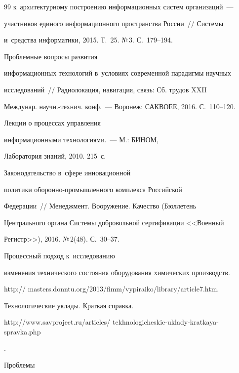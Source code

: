 {{\begin{thebibliography}{99}
к~архитектурному построению информационных систем организаций~--- 


участников единого информационного пространства России~/\!\!/ Системы 


и~средства информатики, 2015. Т.~25. №\,3. С.~179--194.







      Проблемные вопросы развития 


информационных технологий в~условиях современной парадигмы научных 


исследований~/\!\!/ Радиолокация, навигация, связь: Сб. трудов XXII 


Междунар. научн.-технич. конф.~--- Воронеж: САКВОЕЕ, 2016. С.~110--120.




      Лекции о процессах управления 


информационными технологиями.~--- М.: БИНОМ, 


Лаборатория знаний, 2010. 215~с.




      Законодательство в~сфере инновационной 


политики обо\-рон\-но-про\-мыш\-лен\-но\-го комплекса Российской 


Федерации~/\!\!/ Менеджмент. Вооружение. Качество (Бюллетень 


Центрального органа Системы добровольной сертификации <<Военный 


Регистр>>), 2016. №\,2(48). С.~30--37.




      Процессный подход к~исследованию 


изменения технического состояния оборудования химических производств.  


{\sf http:// masters.donntu.org/2013/fimm/vypiraiko/library/article7.htm}. 




     Технологические уклады. Краткая справка. {\sf 


http://www.savproject.ru/articles/ tekhnologicheskie-uklady-kratkaya-spravka.php}.




      Проблемы 



\end{thebibliography}}}
